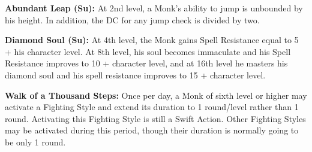 \documentclass[10pt]{article}
\newcommand{\ability}[2]{\smallskip \noindent \textbf{#1} #2}
\begin{document}
\ability{Abundant Leap (Su):}{At 2nd level, a Monk's ability to jump is unbounded by his height. In addition, the DC for any jump check is divided by two.}

\ability{Diamond Soul (Su):}{At 4th level, the Monk gains Spell Resistance equal to 5 + his character level. At 8th level, his soul becomes immaculate and his Spell Resistance improves to 10 + character level, and at 16th level he masters his diamond soul and his spell resistance improves to 15 + character level.}

\ability{Walk of a Thousand Steps:}{Once per day, a Monk of sixth level or higher may activate a Fighting Style and extend its duration to 1 round/level rather than 1 round. Activating this Fighting Style is still a Swift Action. Other Fighting Styles may be activated during this period, though their duration is normally going to be only 1 round.}
\end{document}

